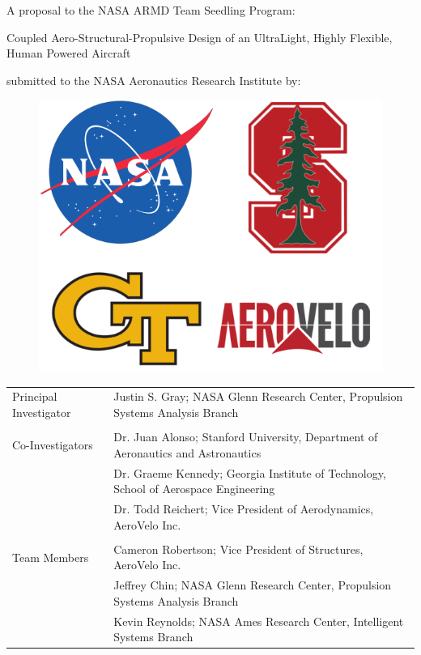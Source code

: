 \documentclass[]{aiaa-tc}
\begin{document}

  \vspace{4em}
  \begin{center}
    A proposal to the NASA ARMD Team Seedling Program: 
    \vspace{2em}

    {\Huge Coupled Aero­-Structural-Propulsive­ Design of an Ultra­Light, Highly Flexible, Human Powered Aircraft}

    \vspace{2em}
    submitted to the NASA Aeronautics Research Institute by: 

    \vspace{3em}
    \begin{figure}
        \centering
        \includegraphics[width=.5\textwidth]{images/seedling_logos}
    \end{figure}
    \vspace{3em}


  \end{center}


  \begin{tabular}{l l}
    Principal Investigator & Justin S. Gray; NASA Glenn Research Center, Propulsion Systems Analysis Branch \\ 
    & \\
    Co-Investigators & Dr. Juan Alonso; Stanford University, Department of Aeronautics and Astronautics \\
                     & Dr. Graeme Kennedy; Georgia Institute of Technology, School of Aerospace Engineering \\ 
                     & Dr. Todd Reichert; Vice President of Aerodynamics, AeroVelo Inc. \\
    & \\ 
    Team Members & Cameron Robertson; Vice President of Structures, AeroVelo Inc. \\ 
                 & Jeffrey Chin; NASA Glenn Research Center, Propulsion Systems Analysis Branch \\
                 & Kevin Reynolds; NASA Ames Research Center, Intelligent Systems Branch \\
  \end{tabular}
\end{document}
